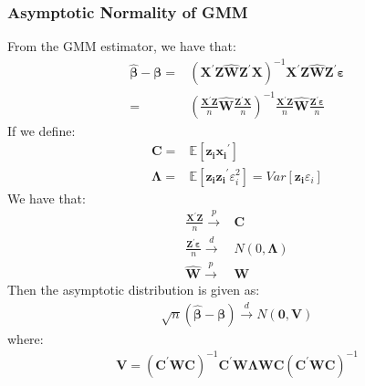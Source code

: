 \documentclass{article}
\begin{document}
\subsubsection{Asymptotic Normality of GMM}
From the GMM estimator, we have that:
	\begin{align*}
		\hat{\boldsymbol{\beta}} - \boldsymbol{\beta} = &(\boldsymbol{X}^\prime \boldsymbol{Z} \hat{\boldsymbol{W}} \boldsymbol{Z}^\prime \boldsymbol{X})^{-1} \boldsymbol{X}^\prime \boldsymbol{Z} \hat{\boldsymbol{W}} \boldsymbol{Z}^\prime \boldsymbol{\varepsilon}\\ = &
		 \left( \frac{\boldsymbol{X}^\prime \boldsymbol{Z}}{n} \hat{\boldsymbol{W}} \frac{\boldsymbol{Z}^\prime \boldsymbol{X}}{n} \right)^{-1} \frac{\boldsymbol{X}^\prime \boldsymbol{Z}}{n} \hat{\boldsymbol{W}} \frac{\boldsymbol{Z}^\prime \boldsymbol{\varepsilon}}{n}
	\end{align*}
If we define:
	\begin{align*}
		\boldsymbol{C} = &\mathbb{E} [\boldsymbol{z_i} \boldsymbol{x_i}^\prime]\\
		\boldsymbol{\Lambda} = &\mathbb{E} [\boldsymbol{z_i} \boldsymbol{z_i}^\prime \varepsilon^2_i] = Var[\boldsymbol{z_i}\varepsilon_i]
	\end{align*}
We have that:
	\begin{align*}
		\frac{\boldsymbol{X}^\prime \boldsymbol{Z}}{n} \xrightarrow{p} &\boldsymbol{C}\\
		\frac{\boldsymbol{Z}^\prime \boldsymbol{\varepsilon}}{n} \xrightarrow{d} &N(0, \boldsymbol{\Lambda})\\
		\hat{\boldsymbol{W}} \xrightarrow{p} &\boldsymbol{W} 
	\end{align*}
Then the asymptotic distribution is given as:
	\begin{align*}
		\sqrt{n} (\hat{\boldsymbol{\beta}} - \boldsymbol{\beta}) \xrightarrow{d} N(\boldsymbol{0}, \boldsymbol{V})
	\end{align*}
where:
	\begin{align*}
		\boldsymbol{V} = (\boldsymbol{C}^\prime \boldsymbol{W} \boldsymbol{C})^{-1} \boldsymbol{C}^\prime \boldsymbol{W} \boldsymbol{\Lambda} \boldsymbol{W} \boldsymbol{C} (\boldsymbol{C}^\prime \boldsymbol{W} \boldsymbol{C})^{-1}
	\end{align*}
\end{document}
